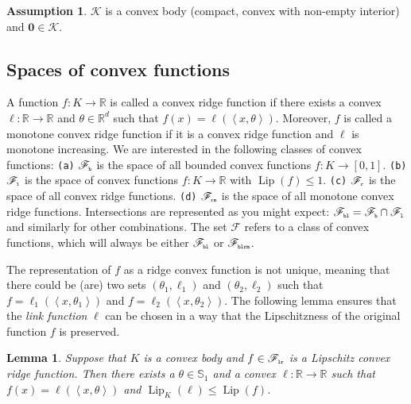 \documentclass[letter, 12pt]{report}
\newcommand{\pr}{\text{\tiny\texttt{r}}}
\newcommand{\pb}{\text{\tiny\texttt{b}}}
\newcommand{\pl}{\text{\tiny\texttt{l}}}
\renewcommand{\pm}{\text{\tiny\texttt{m}}}
\newcommand{\R}{\mathbb R}
\newcommand{\ip}[1]{\left \langle #1 \right \rangle}
\newcommand{\sphere}{\mathbb{S}}
\newcommand{\cK}{\mathcal K}
\newcommand{\sF}{\mathscr F}
\newcommand{\zeros}{ \bm 0}
\newcommand{\lip}{\operatorname{Lip}}
\newcommand{\1}{\mathbf{1}}
\theoremstyle{plain}
\newtheorem{lemma}[theorem]{Lemma}
\theoremstyle{definition}
\newtheorem{assumption}[theorem]{Assumption}
\theoremstyle{remark}
\begin{document}
\begin{assumption}
    $\cK$ is a convex body (compact, convex with non-empty interior) and $\zeros \in \cK$.
\end{assumption}

\subsection{Spaces of convex functions}
A function $f : K \to \R$ is called a convex ridge function if there exists a convex $\ell : \R \to \R$ and $\theta \in \R^d$ such that
$f(x) = \ell(\ip{x, \theta})$. Moreover, $f$ is called a monotone convex ridge function if it is a convex ridge function and $\ell$ is
monotone increasing.
We are interested in the following classes of convex functions:
\texttt{(a)} $\sF_{\pb}$ is the space of all bounded convex functions $f : K \to [0,1]$.
\texttt{(b)} $\sF_{\pl}$ is the space of convex functions $f : K \to \R$ with $\lip(f) \leq 1$.
\texttt{(c)} $\sF_{\pr}$ is the space of all convex ridge functions.
\texttt{(d)} $\sF_{\pr\pm}$ is the space of all monotone convex ridge functions.
Intersections are represented as you might expect: $\sF_{\pb\pl} = \sF_{\pb} \cap \sF_{\pl}$ and similarly for other combinations.
The set $\sF$ refers to a class of convex functions, which will always be either $\sF_{\pb\pl}$ or $\sF_{\pb\pl\pr\pm}$.

The representation of $f$ as a ridge convex function is not unique,
meaning that there could be (are) two sets $(\theta_1, \ell_1)$ and $(\theta_2, \ell_2)$ such that
$f = \ell_1(\ip{x, \theta_1})$ and $f = \ell_2(\ip{x, \theta_2})$.
The following lemma ensures that the \textit{link function} $\ell$ can be chosen
in a way that the Lipschitzness of the original function $f$ is preserved.
\begin{lemma}\label{lem:lip}
    Suppose that $K$ is a convex body and $f \in \sF_{\pl\pr}$ is a Lipschitz convex ridge function.
    Then there exists a $\theta \in \sphere_1$ and a convex $\ell : \R \to \R$
    such that $f(x) = \ell(\ip{x, \theta})$ and $\lip_K(\ell) \leq \lip(f)$.
\end{lemma}
\end{document}
